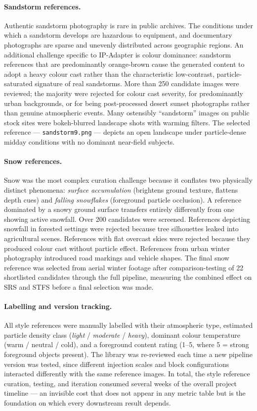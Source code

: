 \paragraph{Sandstorm references.}
Authentic sandstorm photography is rare in public archives. The conditions under which a sandstorm develops are hazardous to equipment, and documentary photographs are sparse and unevenly distributed across geographic regions. An additional challenge specific to IP-Adapter is colour dominance: sandstorm references that are predominantly orange-brown cause the generated content to adopt a heavy colour cast rather than the characteristic low-contrast, particle-saturated signature of real sandstorms. More than 250 candidate images were reviewed; the majority were rejected for colour cast severity, for predominantly urban backgrounds, or for being post-processed desert sunset photographs rather than genuine atmospheric events. Many ostensibly ``sandstorm'' images on public stock sites were bokeh-blurred landscape shots with warming filters. The selected reference --- \texttt{sandstorm9.png} --- depicts an open landscape under particle-dense midday conditions with no dominant near-field subjects.

\paragraph{Snow references.}
Snow was the most complex curation challenge because it conflates two physically distinct phenomena: \emph{surface accumulation} (brightens ground texture, flattens depth cues) and \emph{falling snowflakes} (foreground particle occlusion). A reference dominated by a snowy ground surface transfers entirely differently from one showing active snowfall. Over 200 candidates were screened. References depicting snowfall in forested settings were rejected because tree silhouettes leaked into agricultural scenes. References with flat overcast skies were rejected because they produced colour cast without particle effect. References from urban winter photography introduced road markings and vehicle shapes. The final snow reference was selected from aerial winter footage after comparison-testing of 22 shortlisted candidates through the full pipeline, measuring the combined effect on SRS and STFS before a final selection was made.

\paragraph{Labelling and version tracking.}
All style references were manually labelled with their atmospheric type, estimated particle density class (\textit{light} / \textit{moderate} / \textit{heavy}), dominant colour temperature (warm / neutral / cold), and a foreground content rating (1--5, where 5 = strong foreground objects present). The library was re-reviewed each time a new pipeline version was tested, since different injection scales and block configurations interacted differently with the same reference images. In total, the style reference curation, testing, and iteration consumed several weeks of the overall project timeline --- an invisible cost that does not appear in any metric table but is the foundation on which every downstream result depends.

